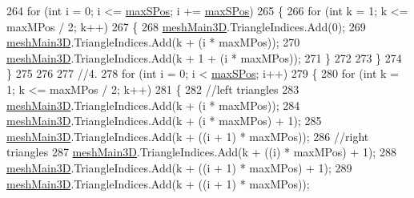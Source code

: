 \begin{DoxyCode}
264                 \textcolor{keywordflow}{for} (\textcolor{keywordtype}{int} i = 0; i <= \hyperlink{class_l_i_d_a_r___controller_1_1_measurement_ad24203fe25dd2b9f232807e2953a2de2}{maxSPos}; i += \hyperlink{class_l_i_d_a_r___controller_1_1_measurement_ad24203fe25dd2b9f232807e2953a2de2}{maxSPos})
265                 \{
266                     \textcolor{keywordflow}{for} (\textcolor{keywordtype}{int} k = 1; k <= maxMPos / 2; k++)
267                     \{
268                         \hyperlink{class_l_i_d_a_r___controller_1_1_measurement_af5ee635f5060386fb2eb131af46b962e}{meshMain3D}.TriangleIndices.Add(0);
269                         \hyperlink{class_l_i_d_a_r___controller_1_1_measurement_af5ee635f5060386fb2eb131af46b962e}{meshMain3D}.TriangleIndices.Add(k + (i * maxMPos));
270                         \hyperlink{class_l_i_d_a_r___controller_1_1_measurement_af5ee635f5060386fb2eb131af46b962e}{meshMain3D}.TriangleIndices.Add(k + 1 + (i * maxMPos));
271                     \}
272 
273                 \}
274             \}
275             
276 
277             \textcolor{comment}{//4.}
278             \textcolor{keywordflow}{for} (\textcolor{keywordtype}{int} i = 0; i < \hyperlink{class_l_i_d_a_r___controller_1_1_measurement_ad24203fe25dd2b9f232807e2953a2de2}{maxSPos}; i++)
279             \{
280                 \textcolor{keywordflow}{for} (\textcolor{keywordtype}{int} k = 1; k <= maxMPos / 2; k++)
281                 \{
282                     \textcolor{comment}{//left triangles}
283                     \hyperlink{class_l_i_d_a_r___controller_1_1_measurement_af5ee635f5060386fb2eb131af46b962e}{meshMain3D}.TriangleIndices.Add(k + (i * maxMPos));
284                     \hyperlink{class_l_i_d_a_r___controller_1_1_measurement_af5ee635f5060386fb2eb131af46b962e}{meshMain3D}.TriangleIndices.Add(k + (i * maxMPos) + 1);
285                     \hyperlink{class_l_i_d_a_r___controller_1_1_measurement_af5ee635f5060386fb2eb131af46b962e}{meshMain3D}.TriangleIndices.Add(k + ((i + 1) * maxMPos));
286                     \textcolor{comment}{//right triangles}
287                     \hyperlink{class_l_i_d_a_r___controller_1_1_measurement_af5ee635f5060386fb2eb131af46b962e}{meshMain3D}.TriangleIndices.Add(k + ((i) * maxMPos) + 1);
288                     \hyperlink{class_l_i_d_a_r___controller_1_1_measurement_af5ee635f5060386fb2eb131af46b962e}{meshMain3D}.TriangleIndices.Add(k + ((i + 1) * maxMPos) + 1);
289                     \hyperlink{class_l_i_d_a_r___controller_1_1_measurement_af5ee635f5060386fb2eb131af46b962e}{meshMain3D}.TriangleIndices.Add(k + ((i + 1) * maxMPos));

\end{DoxyCode}

